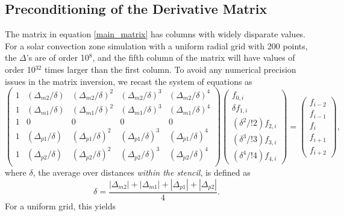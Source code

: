 \documentclass[12pt,letterpaper]{article}
\def\dfz{f_{0,i}}
\def\df{f_{1,i}}
\def\ddf{f_{2,i}}
\def\dddf{f_{3,i}}
\def\ddddf{f_{4,i}}
\begin{document}
\subsection{Preconditioning of the Derivative Matrix}
The matrix in equation \ref{main_matrix} has columns with widely disparate values.  For a solar convection zone simulation with a uniform radial grid with 200 points, the $\Delta$'s are of order 10$^{\mathrm{8}}$, and the fifth column of the matrix will have values of order 10$^{32}$ times larger than the first column.  To avoid any numerical precision issues in the matrix inversion, we recast the system of equations as
\begin{equation}
\left( \begin{array}{ccccc} 
		1 & (\Delta_{m2}/\delta) & (\Delta_{m2}/\delta)^2 & (\Delta_{m2}/\delta)^3 & (\Delta_{m2}/\delta)^4 \\
		1 & (\Delta_{m1}/\delta) & (\Delta_{m1}/\delta)^2 & (\Delta_{m1}/\delta)^3 & (\Delta_{m1}/\delta)^4 \\
		1 & 0 & 0 & 0 & 0 \\
		1 & (\Delta_{p1}/\delta) & (\Delta_{p1}/\delta)^2 & (\Delta_{p1}/\delta)^3 & (\Delta_{p1}/\delta)^4 \\
		1 & (\Delta_{p2}/\delta) & (\Delta_{p2}/\delta)^2 & (\Delta_{p2}/\delta)^3 & (\Delta_{p2}/\delta)^4 \\
\end{array} \right) 
\left( \begin{array}{c} 
\dfz \\ 
\delta\df \\ 
(\delta^2/!2)\ddf \\ 
(\delta^3/!3)\dddf \\
(\delta^4/!4)\ddddf 
\end{array} \right)
=
\left( \begin{array}{c} 
f_{i-2} \\ 
f_{i-1} \\ 
f_{i} \\ 
f_{i+1} \\
f_{i+2} 
\end{array} \right),
\label{precon_matrix}
\end{equation}
where $\delta$, the average over distances \textit{within the stencil}, is defined as
\begin{equation}
\delta = \frac{\left|\Delta_{m2} \right|+ \left|\Delta_{m1} \right| + \left|\Delta_{p1} \right|+ \left|\Delta_{p2} \right|}{4}.
\end{equation}
For a uniform grid, this yields
\end{document}
